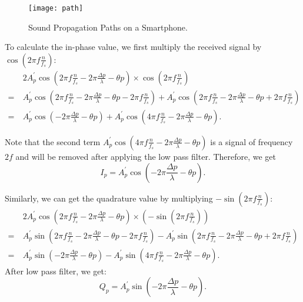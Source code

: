 \begin{figure}[h]
	\centering
	\texttt{[image: path]}
	\caption{Sound Propagation Paths on a Smartphone.}
	\label{fig:soundpath}
\end{figure}

To calculate the in-phase value, we first multiply the received signal by $\cos \left (2\pi f \frac{n}{f_s}\right)$:
\begin{align*}
&2A^\prime_p \cos \left (2\pi f \frac{n}{f_s} - 2 \pi \frac{\Delta p}{\lambda} - \theta p\right) \times \cos \left (2\pi f \frac{n}{f_s}\right)\\    
=~&A^\prime_p \cos \left (2\pi f \frac{n}{f_s} - 2 \pi \frac{\Delta p}{\lambda} - \theta p - 2\pi f \frac{n}{f_s}\right) + A^\prime_p \cos \left (2\pi f \frac{n}{f_s} - 2 \pi \frac{\Delta p}{\lambda} - \theta p + 2\pi f \frac{n}{f_s}\right) \\
=~&A^\prime_p \cos \left( - 2 \pi \frac{\Delta p}{\lambda} - \theta p \right) + A^\prime_p \cos (4\pi f \frac{n}{f_s} - 2 \pi \frac{\Delta p}{\lambda} - \theta p ) .
\end{align*}

Note that the second term $A^\prime_p \cos \left(4\pi f \frac{n}{f_s} - 2 \pi \frac{\Delta p}{\lambda} - \theta p \right) $ is a signal of frequency $2f$ and will be removed after applying the low pass filter. Therefore, we get 
\begin{displaymath}
I_p = A^\prime_p \cos \left( - 2 \pi \frac{\Delta p}{\lambda} - \theta p \right) .
\end{displaymath}

Similarly, we can get the quadrature value by multiplying $-\sin \left (2\pi f \frac{n}{f_s}\right)$:
\begin{align*}
&2A^\prime_p \cos \left (2\pi f \frac{n}{f_s} - 2 \pi \frac{\Delta p}{\lambda} - \theta p\right) \times \left(- \sin \left (2\pi f \frac{n}{f_s}\right)\right)\\    
=~&A^\prime_p \sin \left (2\pi f \frac{n}{f_s} - 2 \pi \frac{\Delta p}{\lambda} - \theta p - 2\pi f \frac{n}{f_s}\right) - A^\prime_p \sin \left (2\pi f \frac{n}{f_s} - 2 \pi \frac{\Delta p}{\lambda} - \theta p + 2\pi f \frac{n}{f_s}\right) \\
=~&A^\prime_p \sin \left( - 2 \pi \frac{\Delta p}{\lambda} - \theta p \right) - A^\prime_p \sin \left(4\pi f \frac{n}{f_s} - 2 \pi \frac{\Delta p}{\lambda} - \theta p \right)  .
\end{align*}
After low pass filter, we get:
\begin{displaymath}
Q_p = A^\prime_p \sin \left( - 2 \pi \frac{\Delta p}{\lambda} - \theta p \right) .
\end{displaymath}


